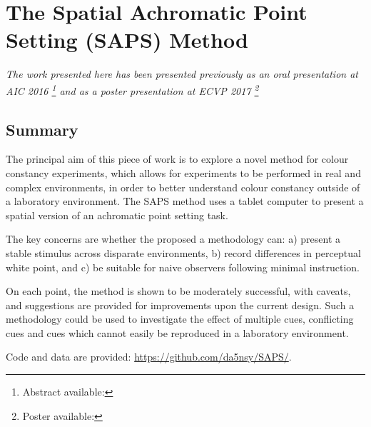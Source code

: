 %
%
%
%
%



\chapter{The Spatial Achromatic Point Setting (SAPS) Method}
\label{TabletMethodChapter}

\textit{The work presented here has been presented previously as an oral presentation at AIC 2016 \citep[p. 125]{garside_estimating_2016}\footnote{Abstract available: } and as a poster presentation at ECVP 2017 \citep[p. 93]{niko_busch_european_2017}\footnote{Poster available: }}

\section{Summary}

The principal aim of this piece of work is to explore a novel method for colour constancy experiments, which allows for experiments to be performed in real and complex environments, in order to better understand colour constancy outside of a laboratory environment. The \gls{SAPS} method uses a tablet computer to present a spatial version of an achromatic point setting task. 

The key concerns are whether the proposed a methodology can: a) present a stable stimulus across disparate environments, b) record differences in perceptual white point, and c) be suitable for naive observers following minimal instruction. 

On each point, the method is shown to be moderately successful, with caveats, and suggestions are provided for improvements upon the current design. Such a methodology could be used to investigate the effect of multiple cues, conflicting cues and cues which cannot easily be reproduced in a laboratory environment.

Code and data are provided: \url{https://github.com/da5nsy/SAPS/}.


